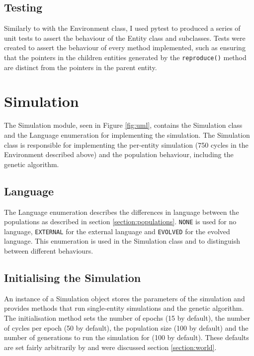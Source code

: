 \documentclass[12pt,a4paper,twoside,openright]{report}
\begin{document}
\subsection{Testing}

Similarly to with the Environment class, I used pytest to produced a series of unit tests to assert the behaviour of the Entity class and subclasses. Tests were created to assert the behaviour of every method implemented, such as ensuring that the pointers in the children entities generated by the \texttt{reproduce()} method are distinct from the pointers in the parent entity.

\section{Simulation}\label{section:simulation}

The Simulation module, seen in Figure \ref{fig:uml}, contains the Simulation class and the Language enumeration for implementing the simulation. The Simulation class is responsible for implementing the per-entity simulation (750 cycles in the Environment described above) and the population behaviour, including the genetic algorithm.

\subsection{Language}

The Language enumeration describes the differences in language between the populations as described in section \ref{section:populations}. \texttt{NONE} is used for no language, \texttt{EXTERNAL} for the external language and \texttt{EVOLVED} for the evolved language. This enumeration is used in the Simulation class and to distinguish between different behaviours.

\subsection{Initialising the Simulation}\label{section:simulation-initialise}

An instance of a Simulation object stores the parameters of the simulation and provides methods that run single-entity simulations and the genetic algorithm. The initialisation method sets the number of epochs (15 by default), the number of cycles per epoch (50 by default), the population size (100 by default) and the number of generations to run the simulation for (100 by default). These defaults are set fairly arbitrarily by \citet{Cangelosi1998} and were discussed section \ref{section:world}.
\end{document}
